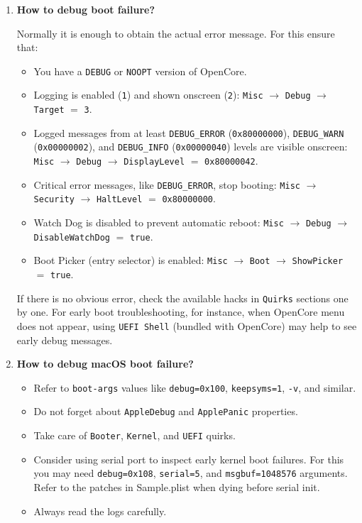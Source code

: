 \documentclass[]{article}
\providecommand{\tightlist}{%
  \setlength{\itemsep}{0pt}\setlength{\parskip}{0pt}}
\begin{document}
\begin{enumerate}
\item
  \textbf{How to debug boot failure?}

  Normally it is enough to obtain the actual error message. For this
  ensure that:
  \begin{itemize}
  \tightlist
  \item You have a \texttt{DEBUG} or \texttt{NOOPT} version of OpenCore.
  \item Logging is enabled (\texttt{1}) and shown onscreen (\texttt{2}):
  \texttt{Misc} $\rightarrow$ \texttt{Debug} $\rightarrow$ \texttt{Target}
  $=$ \texttt{3}.
  \item Logged messages from at least \texttt{DEBUG\_ERROR}
  (\texttt{0x80000000}), \texttt{DEBUG\_WARN} (\texttt{0x00000002}), and
  \texttt{DEBUG\_INFO} (\texttt{0x00000040}) levels are visible onscreen:
  \texttt{Misc} $\rightarrow$ \texttt{Debug} $\rightarrow$ \texttt{DisplayLevel}
  $=$ \texttt{0x80000042}.
  \item Critical error messages, like \texttt{DEBUG\_ERROR}, stop booting:
  \texttt{Misc} $\rightarrow$ \texttt{Security}
  $\rightarrow$ \texttt{HaltLevel} $=$ \texttt{0x80000000}.
  \item Watch Dog is disabled to prevent automatic reboot:
  \texttt{Misc} $\rightarrow$ \texttt{Debug} $\rightarrow$
  \texttt{DisableWatchDog} $=$ \texttt{true}.
  \item Boot Picker (entry selector) is enabled: \texttt{Misc}
  $\rightarrow$ \texttt{Boot} $\rightarrow$ \texttt{ShowPicker} $=$ \texttt{true}.
  \end{itemize}

  If there is no obvious error, check the available hacks in \texttt{Quirks} sections
  one by one. For early boot troubleshooting, for instance, when OpenCore menu does not appear,
  using \texttt{UEFI Shell} (bundled with OpenCore) may help to see
  early debug messages.

\item
  \textbf{How to debug macOS boot failure?}

  \begin{itemize}
  \tightlist
  \item Refer to \texttt{boot-args} values like \texttt{debug=0x100}, \texttt{keepsyms=1},
    \texttt{-v}, and similar.
  \item Do not forget about \texttt{AppleDebug} and \texttt{ApplePanic} properties.
  \item Take care of \texttt{Booter}, \texttt{Kernel}, and \texttt{UEFI} quirks.
  \item Consider using serial port to inspect early kernel boot failures. For this you may
    need \texttt{debug=0x108}, \texttt{serial=5}, and \texttt{msgbuf=1048576} arguments.
    Refer to the patches in Sample.plist when dying before serial init.
  \item Always read the logs carefully.
  \end{itemize}


\end{enumerate}
\end{document}
